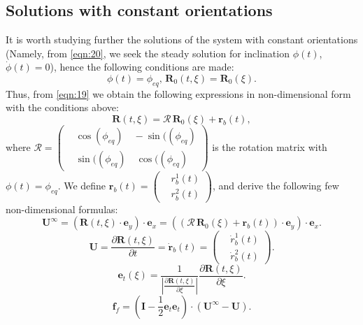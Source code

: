 \documentclass[12pt,MSc,twoside]{muthesis_2020}
\begin{document}
\subsection{Solutions with constant orientations}
It is worth studying further the solutions of the system with constant orientations (Namely, from \eqref{eqn:20}, we seek the steady solution for inclination $\phi(t)$, $\dot{\phi}(t)=0$), hence the following conditions  are made:
\begin{equation}
	\label{eqn:39}
	\phi(t)=\phi_{eq},\, \textbf{R}_0(t,\xi)=\textbf{R}_0(\xi).
\end{equation}
Thus, from \eqref{eqn:19} we obtain the following expressions in non-dimensional form with the conditions above:
\begin{equation}
	\label{eqn:40}
	\textbf{R}(t,\xi)=\bm{\mathcal{R}}\,\textbf{R}_0(\xi)+\textbf{r}_b(t),
\end{equation}
where $\bm{\mathcal{R}}=\left(\begin{aligned}
	&\cos(\phi_{eq})\quad -\sin((\phi_{eq}) \\
	&\sin((\phi_{eq})\quad \cos((\phi_{eq})
\end{aligned}\right) $ is the rotation matrix with $\phi(t)=\phi_{eq}$. We define $\textbf{r}_b(t)=\left(\begin{aligned}
&r_b^{1}(t) \\
&r_b^{2}(t)
\end{aligned}\right)$, and derive the following few non-dimensional formulas:
\begin{equation}
	\label{eqn:41}
	\textbf{U}^{\infty}=\left(\textbf{R}(t,\xi)\cdot\textbf{e}_y\right)\cdot\textbf{e}_x=\left((\bm{\mathcal{R}}\,\textbf{R}_0(\xi)+\textbf{r}_b(t))\cdot\textbf{e}_y\right)\cdot\textbf{e}_x.
\end{equation}
\begin{equation}
	\label{eqn:42}
	\textbf{U}=\frac{\partial\textbf{R}(t,\xi)}{\partial t}=\dot{\textbf{r}}_b(t)=\left(\begin{aligned}
		&\dot{r}_b^{1}(t) \\
		&\dot{r}_b^{2}(t)
	\end{aligned}\right).
\end{equation}
\begin{equation}
	\label{eqn:43}
	\textbf{e}_t(\xi)=\frac{1}{|\frac{\partial\textbf{R}(t,\xi)}{\partial\xi}|}\frac{\partial\textbf{R}(t,\xi)}{\partial\xi}.
\end{equation}
\begin{equation}
	\label{eqn:44}
	\textbf{f}_{f}=\left(\mathbf{I}-\frac{1}{2}\textbf{e}_t\textbf{e}_t\right)\cdot(\textbf{U}^{\infty}-\textbf{U}).
\end{equation}
\end{document}
